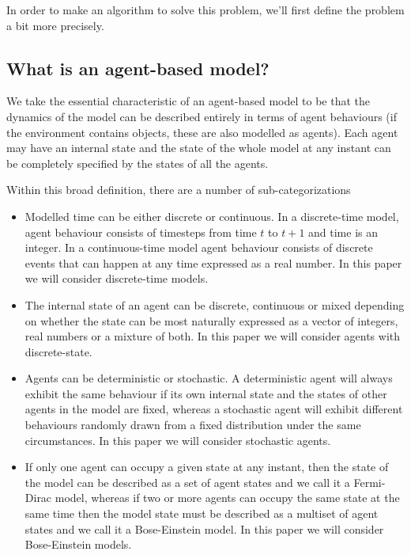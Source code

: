 \documentclass{article}
\begin{document}
In order to make an algorithm to solve this problem, we'll first define the problem a bit more precisely.

\subsection{What is an agent-based model?}

We take the essential characteristic of an agent-based model to be that the dynamics of the model can be described entirely in terms of agent behaviours (if the environment contains objects, these are also modelled as agents). Each agent may have an internal state and the state of the whole model at any instant can be completely specified by the states of all the agents.

Within this broad definition, there are a number of sub-categorizations
\begin{itemize}

\item Modelled time can be either discrete or continuous. In a discrete-time model, agent behaviour consists of timesteps from time $t$ to $t+1$ and time is an integer. In a continuous-time model agent behaviour consists of discrete events that can happen at any time expressed as a real number. In this paper we will consider discrete-time models.

\item The internal state of an agent can be discrete, continuous or mixed depending on whether the state can be most naturally expressed as a vector of integers, real numbers or a mixture of both. In this paper we will consider agents with discrete-state. 

\item Agents can be deterministic or stochastic. A deterministic agent will always exhibit the same behaviour if its own internal state and the states of other agents in the model are fixed, whereas a stochastic agent will exhibit different behaviours randomly drawn from a fixed distribution under the same circumstances. In this paper we will consider stochastic agents.

\item If only one agent can occupy a given state at any instant, then the state of the model can be described as a set of agent states and we call it a Fermi-Dirac model, whereas if two or more agents can occupy the same state at the same time then the model state must be described as a multiset\cite{blizard1988multiset} of agent states and we call it a Bose-Einstein model. In this paper we will consider Bose-Einstein models.

\end{itemize}
\end{document}
